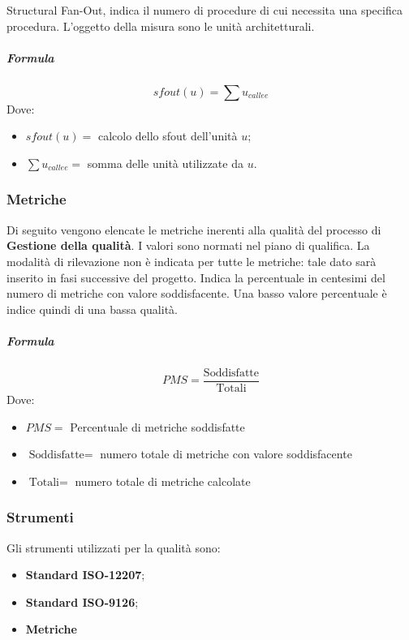         Structural Fan-Out, indica il numero di procedure di cui necessita una 
        specifica procedura. L'oggetto della misura sono le unità architetturali. 
        \subparagraph{Formula}
        \begin{displaymath}
          sfout(u) = \sum u_{callee}
        \end{displaymath}
        Dove:
        \begin{itemize}
          \item[] $sfout(u) =$ calcolo dello sfout dell'unità $u$;
          \item[] $\sum u_{callee} =$ somma delle unità utilizzate da $u$.
        \end{itemize}
		
		\subsubsection{Metriche}
		Di seguito vengono elencate le metriche inerenti alla qualità del processo di \textbf{Gestione della qualità}. I valori sono normati nel piano di qualifica. La modalità di rilevazione non è indicata per tutte le metriche: tale dato sarà 
        inserito in fasi successive del progetto.
        Indica la percentuale in centesimi del numero di metriche con valore soddisfacente. Una basso valore percentuale è indice quindi di una bassa qualità.
        \subparagraph{Formula}
        \begin{displaymath}
          PMS = \frac{\textrm{Soddisfatte}}{\textrm{Totali}}
        \end{displaymath}
        Dove:
        \begin{itemize}
        \item[] $PMS =$ Percentuale di metriche soddisfatte
        \item[] $\textrm{Soddisfatte} =$ numero totale di metriche con valore soddisfacente
        \item[] $\textrm{Totali} =$ numero totale di metriche calcolate
        \end{itemize}
        
    \subsubsection{Strumenti}
		Gli strumenti utilizzati per la qualità sono:
		\begin{itemize}
			\item \textbf{Standard ISO-12207};
			\item \textbf{Standard ISO-9126};
			\item \textbf{Metriche}
		\end{itemize}
	
